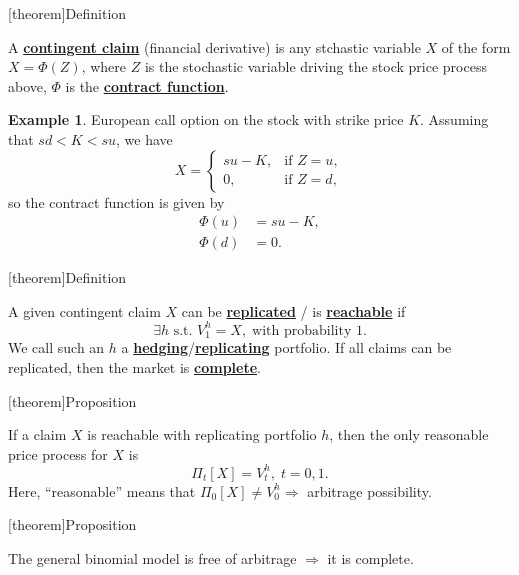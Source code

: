 \documentclass[twocolumn,landscape,10pt]{article}
\theoremstyle{definition}
\begin{document}
[theorem]{Definition}
\begin{contingent claim}
    A \textbf{\underline{contingent claim}} (financial derivative) is any
    stchastic variable $X$ of the form $X=\Phi(Z)$, where $Z$ is the stochastic
    variable driving the stock price process above, $\Phi$ is the
    \textbf{\underline{contract function}}.
\end{contingent claim}

\newtheorem{contingent claim eg}[theorem]{Example}
\begin{contingent claim eg}
European call option on the stock with
strike price $K$. Assuming that $sd<K<su$, we have
\[
    X=
    \begin{cases}
        su-K, &\text{if $Z=u$},\\
        0, &\text{if $Z=d$},
    \end{cases}
\]
so the contract function is given by
\begin{align*}
    \Phi(u) & = su-K,\\
    \Phi(d) & = 0.
\end{align*}
\end{contingent claim eg}

[theorem]{Definition}
\begin{replicated and reachable}
    A given contingent claim $X$ can be \textbf{\underline{replicated}} / is
    \textbf{\underline{reachable}} if
    \[
        \exists h \text{ s.t. } V_1^h=X,\;\text{with probability 1}.
    \]
    We call such an $h$ a
    \textbf{\underline{hedging}}/\textbf{\underline{replicating}} portfolio.
    If all claims can be replicated, then the market is
    \textbf{\underline{complete}}.
\end{replicated and reachable}

[theorem]{Proposition}
\begin{X pricing based on V}
    If a claim $X$ is reachable with replicating portfolio $h$, then the only
    reasonable price process for $X$ is
    \[
        \Pi_t[X]=V_t^h, \;t=0,1.
    \]
    Here, ``reasonable'' means that $\Pi_0[X]\neq V_0^h\Rightarrow$ arbitrage
    possibility.
\end{X pricing based on V}

[theorem]{Proposition}
\begin{no arbitrage leads to complete}
    The general binomial model is free of arbitrage $\Rightarrow$ it is
    complete.
\end{no arbitrage leads to complete}
\end{document}
